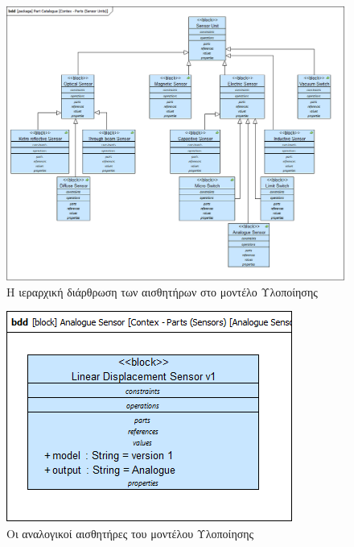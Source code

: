 \documentclass[a4paper,12pt,twoside]{report}
\begin{document}
\begin{appendices}
				\begin{figure}[hp]
					\centering
					\includegraphics[scale=0.30]{DesignModel_Contex-Parts(SensorUnits).png}
					\caption{Η ιεραρχική διάρθρωση των αισθητήρων στο μοντέλο Υλοποίησης}
					\label{φωτ:Η ιεραρχική διάρθρωση των αισθητήρων στο μοντέλο Υλοποίησης}
				\end{figure}
				
				\begin{figure}[hp]
					\centering
					\includegraphics[scale=0.50]{DesignModel_Contex-Parts(Sensors)[AnalogueSensors].png}
					\caption{Οι αναλογικοί αισθητήρες του μοντέλου Υλοποίησης}
					\label{φωτ:Οι αναλογικοί αισθητήρες του μοντέλου Υλοποίησης}
				\end{figure}
				

\end{appendices}
\end{document}
